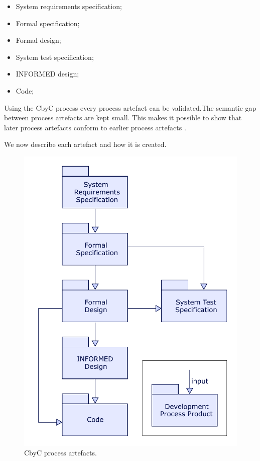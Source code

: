 \begin{itemize}
	\item System requirements specification;
	\item Formal specification;
	\item Formal design;
	\item System test specification;
	\item INFORMED design;
	\item Code;
\end{itemize}

Using the CbyC process every process artefact can be validated.The semantic gap 
between process artefacts are kept small. This makes it possible to show that later 
process artefacts conform to earlier process artefacts \parencite{Tokeneer}.

We now describe each artefact and how it is created.

\begin{figure}[H]
	\centering
	\includegraphics[scale=0.75]{Figures/CbyC_process.pdf}
	\decoRule
	\caption{CbyC process artefacts.}
	\label{fig:CbyCDev}
\end{figure}

